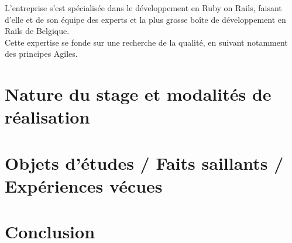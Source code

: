 \documentclass{report}
\begin{document}
  L'entreprise s'est spécialisée dans le développement en Ruby on Rails, faisant d'elle et de son équipe des experts et la plus grosse
  boîte de développement en Rails de Belgique.\\
  Cette expertise se fonde sur une recherche de la qualité, en suivant notamment des principes Agiles.

\chapter{Nature du stage et modalités de réalisation}

\chapter{Objets d'études / Faits saillants / Expériences vécues}

\chapter{Conclusion}
\end{document}
